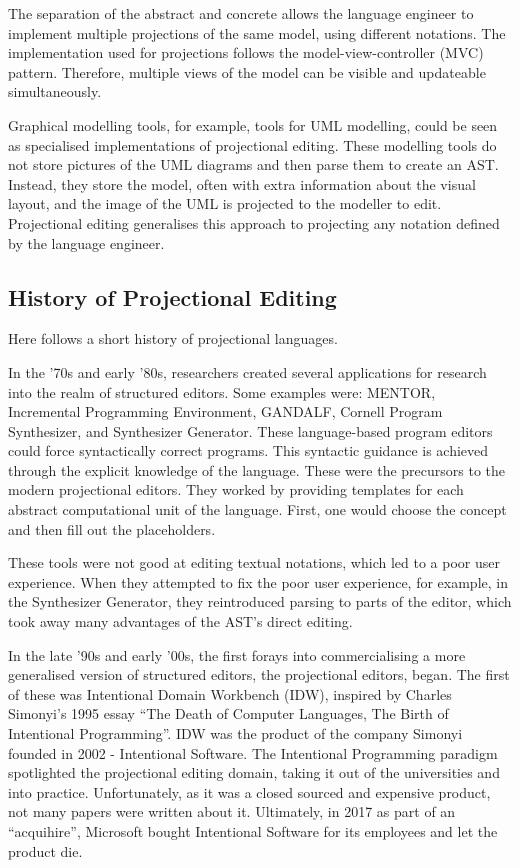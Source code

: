 The separation of the abstract and concrete allows the language engineer to implement multiple projections of the same model, using different notations.
The implementation used for projections follows the model-view-controller (MVC) pattern.
Therefore, multiple views of the model can be visible and updateable simultaneously.

Graphical modelling tools, for example, tools for UML modelling, could be seen as specialised implementations of projectional editing.
These modelling tools do not store pictures of the UML diagrams and then parse them to create an AST.
Instead, they store the model, often with extra information about the visual layout, and the image of the UML is projected to the modeller to edit.
Projectional editing generalises this approach to projecting any notation defined by the language engineer.

\subsection{History of Projectional Editing}

Here follows a short history of projectional languages.

In the '70s and early '80s, researchers created several applications for research into the realm of structured editors.
Some examples were: MENTOR\cite{donzeau1980programming}, Incremental Programming Environment\cite{medina1981incremental}, GANDALF\cite{NotkinDavid1985TGp}, Cornell Program Synthesizer\cite{teitelbaum1981cornell}, and Synthesizer Generator\cite{reps2012synthesizer}.
These language-based program editors could force syntactically correct programs. 
This syntactic guidance is achieved through the explicit knowledge of the language. 
These were the precursors to the modern projectional editors. 
They worked by providing templates for each abstract computational unit of the language.
First, one would choose the concept and then fill out the placeholders.

These tools were not good at editing textual notations, which led to a poor user experience.
When they attempted to fix the poor user experience, for example, in the Synthesizer Generator, they reintroduced parsing to parts of the editor, which took away many advantages of the AST's direct editing.

In the late '90s and early '00s, the first forays into commercialising a more generalised version of structured editors, the projectional editors, began.
The first of these was Intentional Domain Workbench (IDW), inspired by Charles Simonyi's 1995 essay ``The Death of Computer Languages, The Birth of Intentional Programming''\cite{simonyi1995death}.
IDW was the product of the company Simonyi founded in 2002 - Intentional Software. 
The Intentional Programming paradigm spotlighted the projectional editing domain, taking it out of the universities and into practice.
Unfortunately, as it was a closed sourced and expensive product, not many papers were written about it.
Ultimately, in 2017 as part of an ``acquihire'', Microsoft bought Intentional Software for its employees and let the product die.


